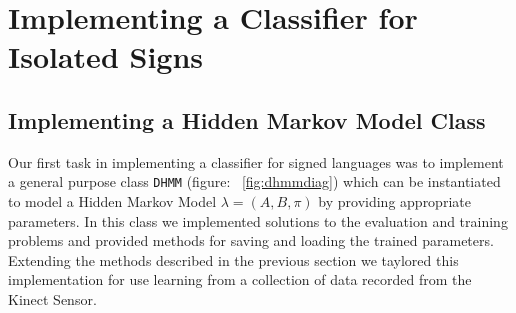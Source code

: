 \chapter{Implementing a Classifier for Isolated Signs}
\ifpdf
    \graphicspath{{Chapter2/Chapter2Figs/PNG/}{Chapter2/Chapter2Figs/PDF/}{Chapter2/Chapter2Figs/}}
\else
    \graphicspath{{Chapter2/Chapter2Figs/EPS/}{Chapter2/Chapter2Figs/}}
\fi

\section{Implementing a Hidden Markov Model Class}
Our first task in implementing a classifier for signed languages was to implement a general purpose class \verb|DHMM| (figure: ~\ref{fig:dhmmdiag}) which can be instantiated to model a Hidden Markov Model $\lambda = (A,B,\pi)$ by providing appropriate parameters. In this class we implemented solutions to the evaluation and training problems and provided methods for saving and loading the trained parameters. Extending the methods described in the previous section we taylored this implementation for use learning from a collection of data recorded from the Kinect Sensor. 
